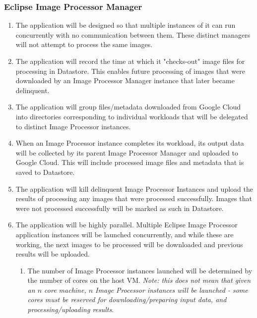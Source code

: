 \documentclass[10pt, onecolumn, draftclsnofoot, letterpaper, compsoc]{IEEEtran}
\begin{document}
\subsubsection{Eclipse Image Processor Manager}
	\begin{enumerate}
		\item The application will be designed so that multiple instances of it
		can run concurrently with no communication between them.
		These distinct managers will not attempt to process the same images.

		\item The application will record the time at which it "checks-out" image
		files for processing in Datastore. This enables future processing of images
		that were downloaded by an Image Processor Manager instance that later became
		delinquent.

		\item The application will group files/metadata downloaded from Google
		Cloud into directories corresponding to individual workloads that will be
		delegated to distinct Image Processor instances.

		\item When an Image Processor instance completes its workload, its output data
		will be collected by its parent Image Processor Manager and uploaded to Google
		Cloud. This will include processed image files and metadata that is saved to
		Datastore.

		\item The application will kill delinquent Image Processor Instances and upload
		the results of processing any images that were processed successfully. Images that
		were not processed successfully will be marked as such in Datastore.

		\item The application will be highly parallel. Multiple Eclipse Image Processor
		application instances will be launched concurrently, and while these are working,
		the next images to be processed will be downloaded and previous results will be
		uploaded.
		\begin{enumerate}
			\item The number of Image Processor instances launched will be determined by
			the number of cores on the host VM. \textit{Note: this does not mean that
			given an \(n\) core machine, \(n\) Image Processor instances will be launched - some cores
			must be reserved for downloading/preparing input data, and processing/uploading results}.
		\end{enumerate}

	\end{enumerate}
\end{document}
